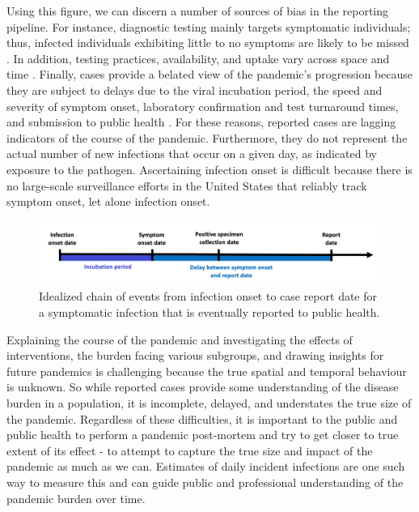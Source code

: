 \documentclass{article}
\begin{document}
Using this figure, we can discern a number of sources of bias in the reporting pipeline. For instance, diagnostic testing mainly targets symptomatic individuals; thus, infected individuals exhibiting little to no symptoms are likely to be missed \citep{cdc2022estimated}. In addition, testing practices, availability, and uptake vary across space and time \citep{pitzer2021impact, ecdc2020strategies, hitchings2021usefulness}. Finally, cases provide a belated view of the pandemic's progression because they are subject to delays due to the viral incubation period, the speed and severity of symptom onset, laboratory confirmation and test turnaround times, and submission to public health \citep{pellis2021challenges, wash2020dash}. For these reasons, reported cases are lagging indicators of the course of the pandemic. Furthermore, they do not represent the actual number of new infections that occur on a given day, as indicated by exposure to the pathogen. Ascertaining infection onset is difficult because there is no large-scale surveillance efforts in the United States that reliably track symptom onset, let alone infection onset.

\begin{figure}[!tb]
\centering
    \includegraphics[width=.99\textwidth]{Chain_of_events_onset_report.pdf} 
    \caption{Idealized chain of events from infection onset to case report date for a symptomatic infection that is eventually reported to public health.}
    \label{fig:chain_events_onset_report}
\end{figure}


Explaining the course of the pandemic and investigating the effects of interventions, the burden facing various subgroups, and drawing insights for future pandemics is challenging because the true spatial and temporal behaviour is unknown. So while reported cases provide some understanding of the disease burden in a population, it is incomplete, delayed, and understates the true size of the pandemic. 
Regardless of these difficulties, it is important to the public and public health to perform a pandemic post-mortem and try to get closer to true extent of its effect - to attempt to capture the true size and impact of the pandemic as much as we can. Estimates of daily incident infections are one such way to measure this and can guide public and professional understanding of the pandemic burden over time.
\end{document}
